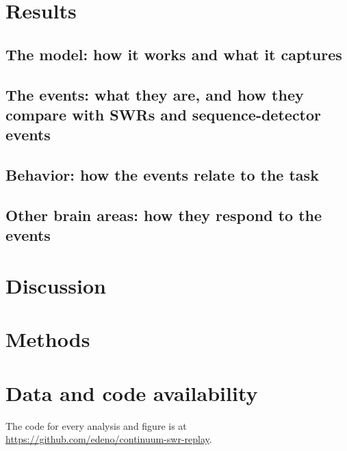 \documentclass[11pt]{article}
\begin{document}

\section{Results}


\subsection{The model: how it works and what it captures}

\subsection{The events: what they are, and how they compare with SWRs and
  sequence-detector events}

\subsection{Behavior: how the events relate to the task}

\subsection{Other brain areas: how they respond to the events}

\section{Discussion}

\section{Methods}

\section*{Data and code availability}

The code for every analysis and figure is at
\url{https://github.com/edeno/continuum-swr-replay}.



\end{document}
